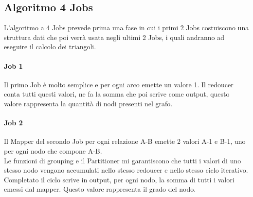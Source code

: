 \documentclass[paper=a4, fontsize=11pt]{scrartcl}	%
\numberwithin{equation}{section}															%
\numberwithin{figure}{section}																%
\numberwithin{table}{section}																%
\begin{document}
\subsection{Algoritmo 4 Jobs}
L'algoritmo a 4 Jobs prevede prima una fase in cui i primi 2 Jobs costuiscono una struttura dati che poi verrà usata negli ultimi 2 Jobs, i quali andranno ad eseguire il calcolo dei triangoli.
\paragraph{Job 1}
Il primo Job è molto semplice e per ogni arco emette un valore 1. Il redoucer conta tutti questi valori, ne fa la somma che poi scrive come output, questo valore rappresenta la quantità di nodi presenti nel grafo.
\paragraph{Job 2}
Il Mapper del secondo Job per ogni relazione A-B emette 2 valori A-1 e B-1, uno per ogni nodo che compone A-B.\\
Le funzioni di grouping e il Partitioner mi garantiscono che tutti i valori di uno stesso nodo vengono accumulati nello stesso redoucer e nello stesso ciclo iterativo. Completato il ciclo scrive in output, per ogni nodo, la somma di tutti i valori emessi dal mapper. Questo valore rappresenta il grado del nodo.
\end{document}

